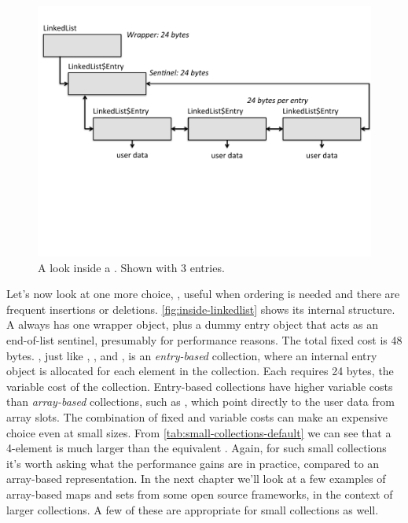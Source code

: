 \begin{figure}
  \centering
 \includegraphics[width=.80\textwidth]{part1/Figures/collections/inside-linkedlist.pdf}
 \caption{A look inside a . Shown with 3
  entries.}
  \label{fig:inside-linkedlist}
\end{figure}

Let's now look at one more choice, , useful when ordering is
needed and there are frequent insertions or deletions.
\autoref{fig:inside-linkedlist} shows its internal structure. A
 always has one wrapper object, plus a dummy entry object that
acts as an end-of-list sentinel, presumably for performance reasons. The total
fixed cost is 48 bytes.
, just like , , and
, is an \emph{entry-based} collection, where an internal entry object
is allocated for each element in the collection. Each 
requires 24 bytes, the variable cost of the collection. Entry-based collections
have higher variable costs than \emph{array-based} collections,
such as , which point directly to the user data from array
slots.
The combination of fixed and variable costs can make  an
expensive choice even at small sizes.  From
\autoref{tab:small-collections-default} we can see that a 4-element
 is much larger than the equivalent . Again, for such
small collections it's worth
asking what the performance gains
are in practice, compared to an array-based representation.  In the next chapter
we'll look at a few examples of array-based maps and sets from some open source
frameworks, in the context of larger collections. A few of these are appropriate
for small collections as well.





